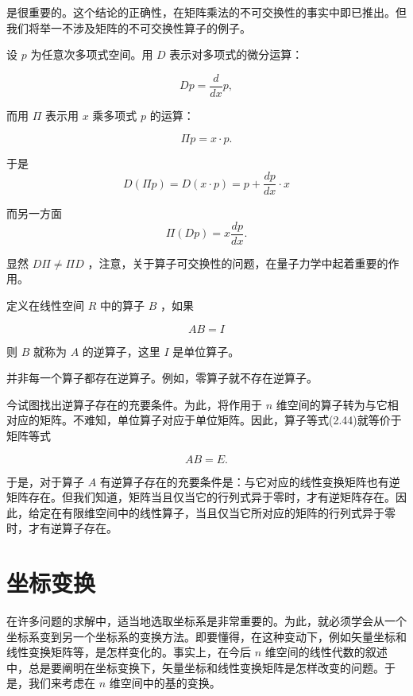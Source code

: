 是很重要的。这个结论的正确性，在矩阵乘法的不可交换性的事实中即已推出。但我们将举一不涉及矩阵的不可交换性算子的例子。

设 $p$ 为任意次多项式空间。用 $D$ 表示对多项式的微分运算：

\begin{equation*}
D p = \frac {d}{d x} p,
\end{equation*}

而用 $\Pi$ 表示用 $x$ 乘多项式 $p$ 的运算：

\begin{equation*}
\Pi p = x \cdot p.
\end{equation*}

于是
\begin{equation*}
D (\Pi p) = D (x \cdot p) = p + \frac {d p}{d x} \cdot x
\end{equation*}

而另一方面
\begin{equation*}
\Pi (D p) = x \frac {d p}{d x}.
\end{equation*}

显然 $D\Pi \neq \Pi D$ ，注意，关于算子可交换性的问题，在量子力学中起着重要的作用。

定义在线性空间 $R$ 中的算子 $B$ ，如果

\begin{equation*}
A B = I\tag{2.44}
\end{equation*}

则 $B$ 就称为 $A$ 的逆算子，这里 $I$ 是单位算子。

并非每一个算子都存在逆算子。例如，零算子就不存在逆算子。

今试图找出逆算子存在的充要条件。为此，将作用于 $n$ 维空间的算子转为与它相对应的矩阵。不难知，单位算子对应于单位矩阵。因此，算子等式(2.44)就等价于矩阵等式

\begin{equation*}
A B = E.\tag{2.45}
\end{equation*}

于是，对于算子 $A$ 有逆算子存在的充要条件是：与它对应的线性变换矩阵也有逆矩阵存在。但我们知道，矩阵当且仅当它的行列式异于零时，才有逆矩阵存在。因此，给定在有限维空间中的线性算子，当且仅当它所对应的矩阵的行列式异于零时，才有逆算子存在。

\section{坐标变换}

在许多问题的求解中，适当地选取坐标系是非常重要的。为此，就必须学会从一个坐标系变到另一个坐标系的变换方法。即要懂得，在这种变动下，例如矢量坐标和线性变换矩阵等，是怎样变化的。事实上，在今后 $n$ 维空间的线性代数的叙述中，总是要阐明在坐标变换下，矢量坐标和线性变换矩阵是怎样改变的问题。于是，我们来考虑在 $n$ 维空间中的基的变换。

